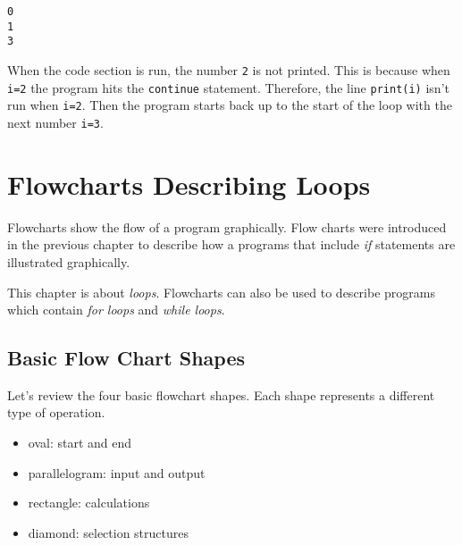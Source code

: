 \documentclass{book}
\providecommand{\tightlist}{%
      \setlength{\itemsep}{0pt}\setlength{\parskip}{0pt}}
\newcommand{\passthrough}[1]{#1}
\begin{document}
    \begin{Verbatim}[commandchars=\\\{\}]
0
1
3

    \end{Verbatim}


    
        When the code section is run, the number \passthrough{\lstinline!2!} is
not printed. This is because when \passthrough{\lstinline!i=2!} the
program hits the \passthrough{\lstinline!continue!} statement.
Therefore, the line \passthrough{\lstinline!print(i)!} isn't run when
\passthrough{\lstinline!i=2!}. Then the program starts back up to the
start of the loop with the next number \passthrough{\lstinline!i=3!}.
    




    
        \hypertarget{flowcharts-describing-loops}{%
\section{Flowcharts Describing
Loops}\label{flowcharts-describing-loops}}
    




    
        Flowcharts show the flow of a program graphically. Flow charts were
introduced in the previous chapter to describe how a programs that
include \emph{if} statements are illustrated graphically.

This chapter is about \emph{loops}. Flowcharts can also be used to
describe programs which contain \emph{for loops} and \emph{while loops}.
    




    
        \hypertarget{basic-flow-chart-shapes}{%
\subsection{Basic Flow Chart Shapes}\label{basic-flow-chart-shapes}}
    




    
        Let's review the four basic flowchart shapes. Each shape represents a
different type of operation.

\begin{itemize}
\tightlist
\item
  oval: start and end
\item
  parallelogram: input and output
\item
  rectangle: calculations
\item
  diamond: selection structures
\end{itemize}
\end{document}

